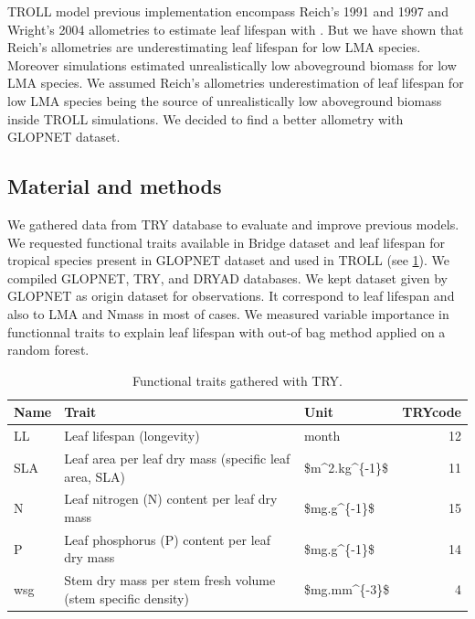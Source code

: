 \documentclass[12pt,]{article}
\theoremstyle{definition}
\theoremstyle{definition}
\theoremstyle{remark}
\begin{document}
TROLL model previous implementation encompass Reich's 1991 and 1997 and
Wright's 2004 allometries to estimate leaf lifespan with
\citep{Reich1991a, Reich1997, wright_worldwide_2004}. But we have shown
that Reich's allometries are underestimating leaf lifespan for low LMA
species. Moreover simulations estimated unrealistically low aboveground
biomass for low LMA species. We assumed Reich's allometries
underestimation of leaf lifespan for low LMA species being the source of
unrealistically low aboveground biomass inside TROLL simulations. We
decided to find a better allometry with \citet{wright_worldwide_2004}
GLOPNET dataset.

\subsection{Material and methods}\label{material-and-methods-1}

We gathered data from TRY database to evaluate and improve previous
models. We requested functional traits available in Bridge dataset and
leaf lifespan for tropical species present in GLOPNET dataset and used
in TROLL (see \ref{tab:A2traits}). We compiled GLOPNET, TRY, and DRYAD
databases. We kept dataset given by GLOPNET as origin dataset for
observations. It correspond to leaf lifespan and also to LMA and Nmass
in most of cases. We measured variable importance in functionnal traits
to explain leaf lifespan with out-of bag method applied on a random
forest.

\begin{table}

\caption{\label{tab:A2traits}Functional traits gathered with TRY.}
\centering
\begin{tabular}[t]{l|l|l|r}
\hline
Name & Trait & Unit & TRYcode\\
\hline
LL & Leaf lifespan (longevity) & month & 12\\
\hline
SLA & Leaf area per leaf dry mass (specific leaf area, SLA) & \$m\textasciicircum{}2.kg\textasciicircum{}\{-1\}\$ & 11\\
\hline
N & Leaf nitrogen (N) content per leaf dry mass & \$mg.g\textasciicircum{}\{-1\}\$ & 15\\
\hline
P & Leaf phosphorus (P) content per leaf dry mass & \$mg.g\textasciicircum{}\{-1\}\$ & 14\\
\hline
wsg & Stem dry mass per stem fresh volume (stem specific density) & \$mg.mm\textasciicircum{}\{-3\}\$ & 4\\
\hline
\end{tabular}
\end{table}
\end{document}

